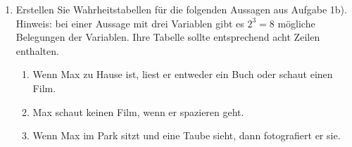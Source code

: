 \documentclass[ngerman,11pt]{article}
\begin{document}
\begin {enumerate}
\item Erstellen Sie Wahrheitstabellen für die  folgenden Aussagen aus Aufgabe 1b). Hinweis: bei einer Aussage mit drei Variablen gibt es $2^3 = 8$ mögliche Belegungen der Variablen. Ihre Tabelle sollte entsprechend acht Zeilen enthalten.

\begin{enumerate}
\item Wenn Max zu Hause ist, liest er entweder ein Buch oder schaut einen Film.
\item Max schaut keinen Film, wenn er spazieren geht.
\item Wenn Max im Park sitzt und eine Taube sieht, dann fotografiert er sie.
\end{enumerate}


\end{enumerate}
\end{document}
